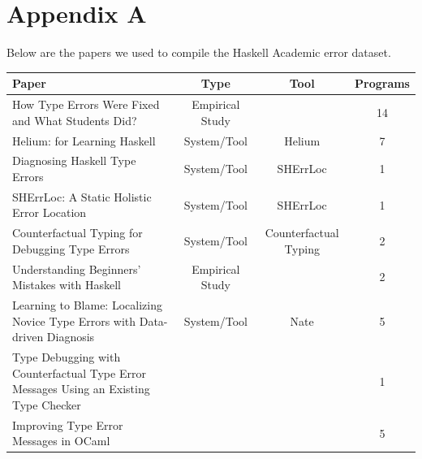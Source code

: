 \documentclass[pdflatex,lineno,sn-nature,Numbered]{sn-jnl}%
\begin{document}



\newpage

\appendix

\section{Appendix A} \label{sec:appendix-a}

Below are the papers we used to compile the Haskell Academic error dataset.

\begin{table}[h]
\centering
\begin{tabular}{|p{5cm}|c|c|c|}
    \hline
    \textbf{Paper} & \textbf{Type} & \textbf{Tool} & \textbf{Programs} \\ \hline

  \raggedright
    How Type Errors Were Fixed and What Students Did? &
    Empirical Study &
    &
    14  \\ \hline

  \raggedright
    Helium: for Learning Haskell &
    System/Tool &
    Helium &
    7 \\ \hline

  \raggedright
    Diagnosing Haskell Type Errors &
    System/Tool &
    SHErrLoc &
    1 \\ \hline

  \raggedright
    SHErrLoc: A Static Holistic Error Location &
    System/Tool &
    SHErrLoc &
    1 \\ \hline

  \raggedright
    Counterfactual Typing for Debugging Type Errors &
    System/Tool &
    Counterfactual Typing &
    2 \\ \hline
  
  \raggedright
    Understanding Beginners' Mistakes with Haskell &
    Empirical Study &
    &
    2 \\ \hline
  
  \raggedright
    Learning to Blame: Localizing Novice Type Errors with Data-driven Diagnosis &
    System/Tool &
    Nate &
    5 \\ \hline

  \raggedright
    Type Debugging with Counterfactual Type Error Messages Using an Existing Type Checker &
    &
    &
    1 \\ \hline

  \raggedright
    Improving Type Error Messages in OCaml &
    &
    &
    5 \\ \hline


\end{tabular}
\end{table}
\end{document}
